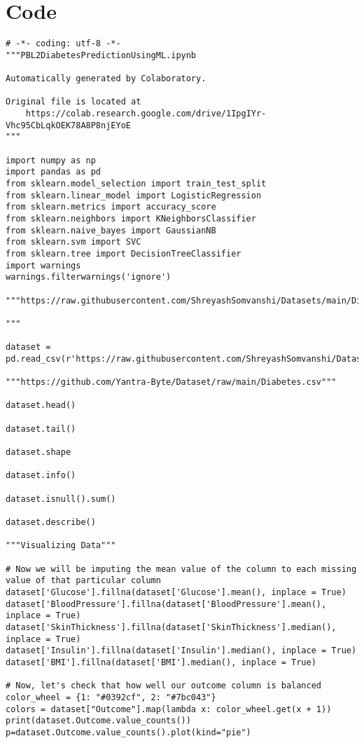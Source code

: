 \documentclass[pdftex,a4paper,11pt,oneside,openright]{report}
\begin{document}
\chapter{Code}
\begin{lstlisting}
# -*- coding: utf-8 -*-
"""PBL2DiabetesPredictionUsingML.ipynb

Automatically generated by Colaboratory.

Original file is located at
    https://colab.research.google.com/drive/1IpgIYr-Vhc95CbLqkOEK78A8P8njEYoE
"""

import numpy as np
import pandas as pd
from sklearn.model_selection import train_test_split
from sklearn.linear_model import LogisticRegression
from sklearn.metrics import accuracy_score
from sklearn.neighbors import KNeighborsClassifier
from sklearn.naive_bayes import GaussianNB
from sklearn.svm import SVC
from sklearn.tree import DecisionTreeClassifier
import warnings
warnings.filterwarnings('ignore')

"""https://raw.githubusercontent.com/ShreyashSomvanshi/Datasets/main/Diabetes.csv

"""

dataset = pd.read_csv(r'https://raw.githubusercontent.com/ShreyashSomvanshi/Datasets/main/Diabetes.csv')

"""https://github.com/Yantra-Byte/Dataset/raw/main/Diabetes.csv"""

dataset.head()

dataset.tail()

dataset.shape

dataset.info()

dataset.isnull().sum()

dataset.describe()

"""Visualizing Data"""

# Now we will be imputing the mean value of the column to each missing value of that particular column
dataset['Glucose'].fillna(dataset['Glucose'].mean(), inplace = True)
dataset['BloodPressure'].fillna(dataset['BloodPressure'].mean(), inplace = True)
dataset['SkinThickness'].fillna(dataset['SkinThickness'].median(), inplace = True)
dataset['Insulin'].fillna(dataset['Insulin'].median(), inplace = True)
dataset['BMI'].fillna(dataset['BMI'].median(), inplace = True)

# Now, let's check that how well our outcome column is balanced
color_wheel = {1: "#0392cf", 2: "#7bc043"}
colors = dataset["Outcome"].map(lambda x: color_wheel.get(x + 1))
print(dataset.Outcome.value_counts())
p=dataset.Outcome.value_counts().plot(kind="pie")


\end{lstlisting}
\end{document}
